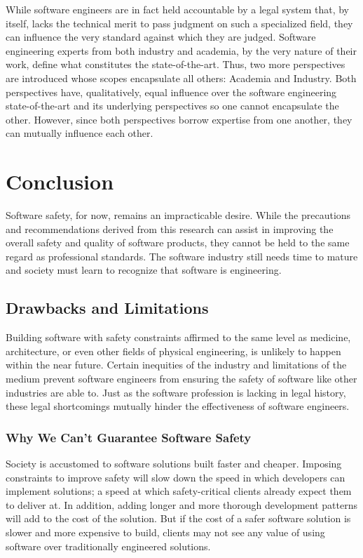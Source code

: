 \documentclass[12pt]{report}
\begin{document}
While software engineers are in fact held accountable by a legal system that, by itself, lacks the technical merit to pass judgment on such a specialized field, they can influence the very standard against which they are judged. Software engineering experts from both industry and academia, by the very nature of their work, define what constitutes the state-of-the-art. Thus, two more perspectives are introduced whose scopes encapsulate all others: Academia and Industry. Both perspectives have, qualitatively, equal influence over the software engineering state-of-the-art and its underlying perspectives so one cannot encapsulate the other. However, since both perspectives borrow expertise from one another, they can mutually influence each other. 

\chapter{Conclusion} 
Software safety, for now, remains an impracticable desire. While the precautions and recommendations derived from this research can assist in improving the overall safety and quality of software products, they cannot be held to the same regard as professional standards. The software industry still needs time to mature and society must learn to recognize that software is engineering. 

\section{Drawbacks and Limitations} 
Building software with safety constraints affirmed to the same level as medicine, architecture, or even other fields of physical engineering, is unlikely to happen within the near future. Certain inequities of the industry and limitations of the medium prevent software engineers from ensuring the safety of software like other industries are able to. 
Just as the software profession is lacking in legal history, these legal shortcomings mutually hinder the effectiveness of software engineers. 

\subsection{Why We Can't Guarantee Software Safety} 
Society is accustomed to software solutions built faster and cheaper. Imposing constraints to improve safety will slow down the speed in which developers can implement solutions; a speed at which safety-critical clients already expect them to deliver at. In addition, adding longer and more thorough development patterns will add to the cost of the solution. But if the cost of a safer software solution is slower and more expensive to build, clients may not see any value of using software over traditionally engineered solutions.
\end{document}
